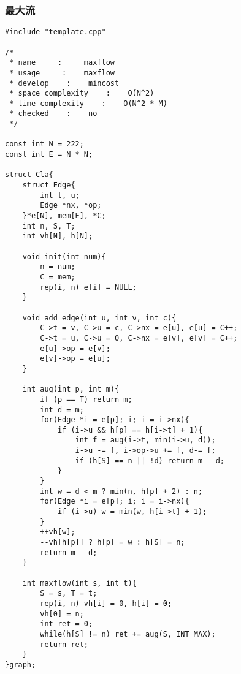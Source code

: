 \subsubsection{最大流}
\begin{verbatim}
#include "template.cpp" 

/*
 * name     :     maxflow
 * usage     :    maxflow
 * develop    :    mincost
 * space complexity    :    O(N^2)
 * time complexity    :    O(N^2 * M)
 * checked    :    no
 */

const int N = 222;
const int E = N * N;

struct Cla{
    struct Edge{
        int t, u;
        Edge *nx, *op;
    }*e[N], mem[E], *C;
    int n, S, T;
    int vh[N], h[N];

    void init(int num){
        n = num;
        C = mem;
        rep(i, n) e[i] = NULL;
    }

    void add_edge(int u, int v, int c){
        C->t = v, C->u = c, C->nx = e[u], e[u] = C++;
        C->t = u, C->u = 0, C->nx = e[v], e[v] = C++;
        e[u]->op = e[v];
        e[v]->op = e[u];
    }

    int aug(int p, int m){
        if (p == T) return m;
        int d = m;
        for(Edge *i = e[p]; i; i = i->nx){
            if (i->u && h[p] == h[i->t] + 1){
                int f = aug(i->t, min(i->u, d));
                i->u -= f, i->op->u += f, d-= f;
                if (h[S] == n || !d) return m - d;
            }
        }
        int w = d < m ? min(n, h[p] + 2) : n;
        for(Edge *i = e[p]; i; i = i->nx){
            if (i->u) w = min(w, h[i->t] + 1);
        }
        ++vh[w];
        --vh[h[p]] ? h[p] = w : h[S] = n;
        return m - d;
    }

    int maxflow(int s, int t){
        S = s, T = t;
        rep(i, n) vh[i] = 0, h[i] = 0;
        vh[0] = n;
        int ret = 0;
        while(h[S] != n) ret += aug(S, INT_MAX);
        return ret;
    }
}graph;
\end{verbatim}
